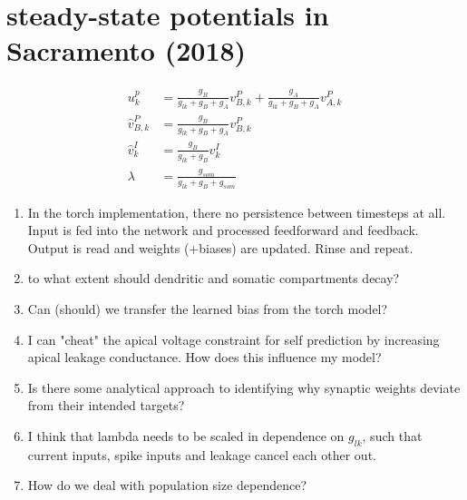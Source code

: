 \documentclass[12pt,a4paper,titlepage]{report}
\begin{document}
\section{steady-state potentials in Sacramento (2018)}

\begin{align*}
u_k^p &= \frac{g_B}{g_{lk} + g_B + g_A} v^P_{B,k} + \frac{g_A}{g_{lk} + g_B + g_A} v^P_{A,k} \\
\hat{v}^P_{B,k} &= \frac{g_B}{g_{lk} + g_B + g_A} v^P_{B,k}\\
\hat{v}^I_{k} &= \frac{g_B}{g_{lk} + g_B} v^I_{k}\\
\lambda &= \frac{g_{som}}{g_{lk} + g_B + g_{som}}
\end{align*}



\begin{enumerate}
  \item In the torch implementation, there no persistence between timesteps at all. Input is fed into the network and processed feedforward and feedback. Output is read and weights (+biases) are updated. Rinse and repeat.
  \item to what extent should dendritic and somatic compartments decay?
  \item Can (should) we transfer the learned bias from the torch model?
  \item I can "cheat" the apical voltage constraint for self prediction by increasing apical leakage conductance. How does this influence my model?
  \item Is there some analytical approach to identifying why synaptic weights deviate from their intended targets?
  \item I think that lambda needs to be scaled in dependence on $g_{lk}$, such that current inputs, spike inputs and leakage cancel each other out.

    \item How do we deal with population size dependence?

\end{enumerate}
\end{document}
